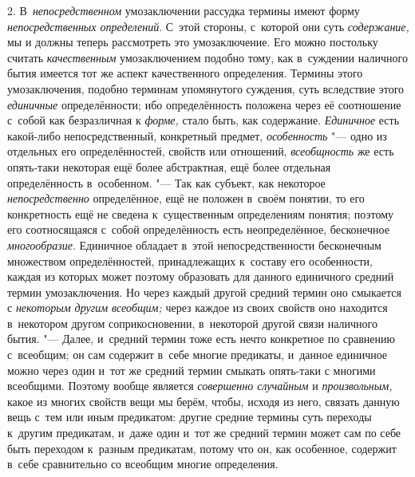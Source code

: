 2. В~{\em непосредственном}
умозаключении рассудка термины имеют форму
{\em непосредственных определений}.
С~этой стороны, с~которой они суть
{\em содержание,} мы и
должны теперь рассмотреть это умозаключение. Его можно постольку считать
{\em качественным}
умозаключением подобно тому, как в~суждении наличного бытия
имеется тот же аспект качественного определения. Термины этого
умозаключения, подобно терминам упомянутого суждения, суть вследствие этого
{\em единичные}
определённости; ибо определённость положена через её
соотношение с~собой как безразличная к
{\em форме,} стало быть,
как содержание. {\em Единичное}
есть какой-либо непосредственный, конкретный предмет,
{\em особенность} "--- одно
из отдельных его определённостей, свойств или отношений,
{\em всеобщность} же есть
опять-таки некоторая ещё более абстрактная, ещё более отдельная
определённость в~особенном. "--- Так как субъект, как некоторое
{\em непосредственно}
определённое, ещё не положен в~своём понятии, то его
конкретность ещё не сведена к~существенным определениям понятия; поэтому
его соотносящаяся с~собой определённость есть
неопределённое, бесконечное
{\em многообразие}.
Единичное обладает в~этой непосредственности бесконечным
множеством определённостей, принадлежащих к~составу его особенности, каждая
из которых может поэтому образовать для данного единичного средний термин
умозаключения. Но через каждый другой средний термин оно смыкается с
{\em некоторым другим всеобщим;}
через каждое из своих свойств оно находится в~некотором
другом соприкосновении, в~некоторой другой связи наличного бытия. "---
Далее, и~средний термин тоже есть нечто конкретное по
сравнению с~всеобщим; он сам содержит в~себе многие предикаты, и~данное
единичное можно через один и~тот же средний термин смыкать опять-таки с
многими всеобщими. Поэтому вообще является
{\em совершенно случайным}
и {\em произвольным,}
какое из многих свойств вещи мы берём, чтобы, исходя из него,
связать данную вещь с~тем или иным предикатом: другие средние термины суть
переходы к~другим предикатам, и~даже один и~тот же средний термин может сам
по себе быть переходом к~разным предикатам, потому что он, как особенное,
содержит в~себе сравнительно со всеобщим многие определения.


